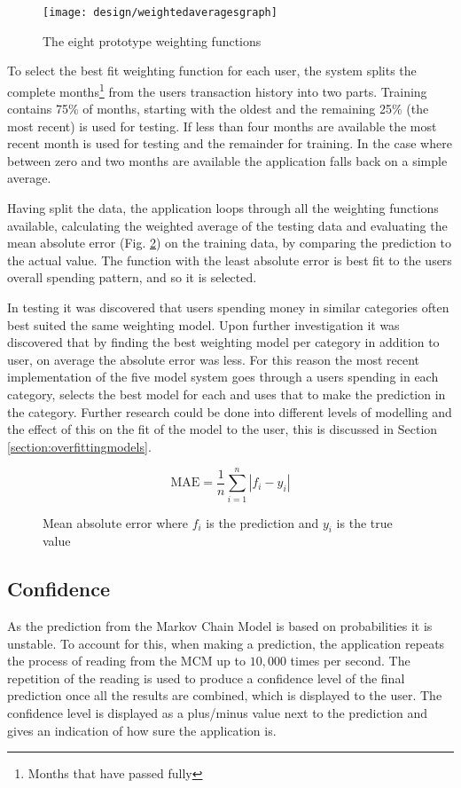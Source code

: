 \begin{figure}[h]
    \centering
    \texttt{[image: design/weightedaveragesgraph]}
    \caption{The eight prototype weighting functions}
    \label{fig:weightedaveragegraph}
\end{figure}

To select the best fit weighting function for each user, the system splits the complete months\footnote{Months that have passed fully} from the users transaction history into two parts. Training contains 75\% of months, starting with the oldest and the remaining 25\% (the most recent) is used for testing.
%
If less than four months are available the most recent month is used for testing and the remainder for training. In the case where between zero and two months are available the application falls back on a simple average.

Having split the data, the application loops through all the weighting functions available, calculating the weighted average of the testing data and evaluating the mean absolute error (Fig. \ref{fig:absoluteerror}) on the training data, by comparing the prediction to the actual value. The function with the least absolute error is best fit to the users overall spending pattern, and so it is selected.

In testing it was discovered that users spending money in similar categories often best suited the same weighting model. Upon further investigation it was discovered that by finding the best weighting model per category in addition to user, on average the absolute error was less. For this reason the most recent implementation of the five model system goes through a users spending in each category, selects the best model for each and uses that to make the prediction in the category. Further research could be done into different levels of modelling and the effect of this on the fit of the model to the user, this is discussed in Section \ref{section:overfittingmodels}.

\begin{figure}[h]
    \centering
    \[
        \mathrm{MAE} = \frac{1}{n}\sum_{i=1}^n \left| f_i-y_i\right| 
    \]
    \caption[Mean absolute error formula]{Mean absolute error where $f_i$ is the prediction and $y_i$ is the true value}
    \label{fig:absoluteerror}
\end{figure}

 

\subsection{Confidence}
As the prediction from the Markov Chain Model is based on probabilities it is unstable. To account for this, when making a prediction, the application repeats the process of reading from the MCM up to $10,000$ times per second. The repetition of the reading is used to produce a confidence level of the final prediction once all the results are combined, which is displayed to the user. The confidence level is displayed as a plus/minus value next to the prediction and gives an indication of how sure the application is. 

